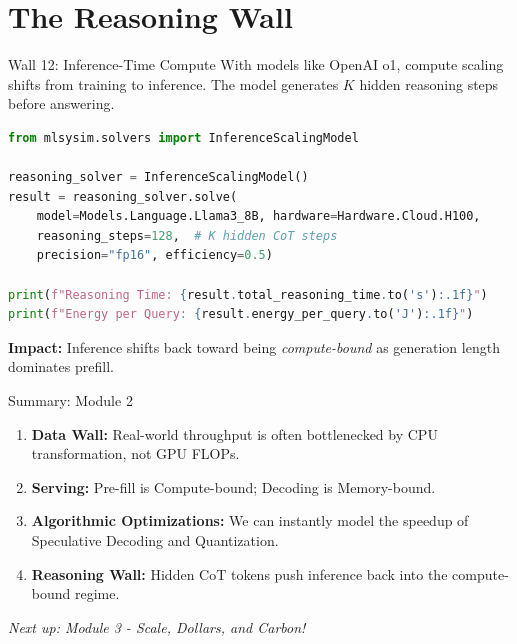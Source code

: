 \documentclass[aspectratio=169, 12pt]{beamer}
\begin{document}
\section{The Reasoning Wall}

\begin{frame}[fragile,shrink=8]{Wall 12: Inference-Time Compute}
With models like OpenAI o1, compute scaling shifts from training to inference. The model generates $K$ hidden reasoning steps before answering.
\begin{lstlisting}[language=Python]
from mlsysim.solvers import InferenceScalingModel

reasoning_solver = InferenceScalingModel()
result = reasoning_solver.solve(
    model=Models.Language.Llama3_8B, hardware=Hardware.Cloud.H100,
    reasoning_steps=128,  # K hidden CoT steps
    precision="fp16", efficiency=0.5)

print(f"Reasoning Time: {result.total_reasoning_time.to('s'):.1f}")
print(f"Energy per Query: {result.energy_per_query.to('J'):.1f}")
\end{lstlisting}
\vfill
\textbf{Impact:} Inference shifts back toward being \emph{compute-bound} as generation length dominates prefill.
\end{frame}

\begin{frame}{Summary: Module 2}
\begin{enumerate}
  \item \textbf{Data Wall:} Real-world throughput is often bottlenecked by CPU transformation, not GPU FLOPs.
  \item \textbf{Serving:} Pre-fill is Compute-bound; Decoding is Memory-bound.
  \item \textbf{Algorithmic Optimizations:} We can instantly model the speedup of Speculative Decoding and Quantization.
  \item \textbf{Reasoning Wall:} Hidden CoT tokens push inference back into the compute-bound regime.
\end{enumerate}
\vspace{1em}
\begin{center}
\textit{Next up: Module 3 - Scale, Dollars, and Carbon!}
\end{center}
\end{frame}
\end{document}
